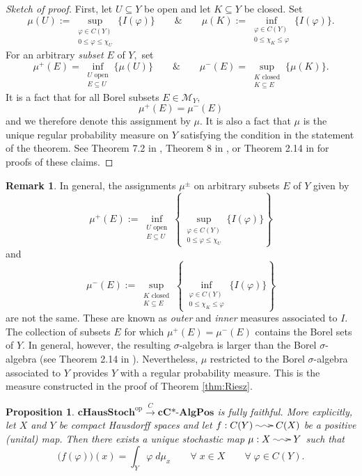 \documentclass[12pt]{article}
\makeatletter
\edef\t{\pgfmathresult}%
\theoremstyle{theorem}
\newtheorem{proposition}[equation]{Proposition}
\theoremstyle{definition}
\newtheorem{remark}[equation]{Remark}
\numberwithin{equation}{section}
\let\s=\sigma \let\t=\tau \let\u=\upsilon \let\f=\phi \let\c=\chi
\def\vf{\varphi}
\newcommand{\be}{\begin{equation}}
\newcommand{\ee}{\end{equation}}
\newcommand{\bn}{\begin{proposition}}
\newcommand{\en}{\end{proposition}}
\newcommand{\bprf}{\begin{proof}}
\newcommand{\eprf}{\end{proof}}
\newcommand{\br}{\begin{remark}}
\newcommand{\er}{\end{remark}}
\newcommand{\<}{\langle}
\renewcommand{\>}{\rangle}
\newcommand{\aand}{\qquad \& \qquad}
\def\K{{{\mathbb K}}}
\newcommand{\cCAlgPos}{\mathbf{cC\text{*-}AlgPos}}
\newcommand{\op}{\mathrm{op}}
\newcommand{\cHStoch}{\mathbf{cHausStoch}}
\newcommand{\stoch}{\;\xy0;/r.25pc/:\ar@{~>}(3,0);(-3,0);\endxy\;}
\makeatother
\begin{document}
\bprf
[Sketch of proof]
First, let $U\subseteq Y$ be open and let $K\subseteq Y$ be closed. 
Set 
\be
\mu(U):=\sup_{\substack{\vf\in C(Y)\\0\le\vf\le\chi_{U}}}\big\{I(\vf)\big\}
\aand
\mu(K):=\inf_{\substack{\vf\in C(Y)\\0\le\chi_{K}\le\vf}}\big\{I(\vf)\big\}.
\ee
For an arbitrary \emph{subset} $E$ of $Y,$ set 
\be
\mu^{+}(E)=\inf_{\substack{\text{$U$ open}\\E\subseteq U}}\big\{\mu(U)\big\}
\aand
\mu^{-}(E)=\sup_{\substack{\text{$K$ closed}\\K\subseteq E}}\big\{\mu(K)\big\}.
\ee
It is a fact that for all Borel subsets $E\in\mathcal{M}_{Y},$
\be
\mu^{+}(E)=\mu^{-}(E)
\ee
and we therefore denote this assignment by $\mu.$ It is also a fact that
$\mu$ is the unique regular probability measure on $Y$ satisfying the
condition in the statement of the theorem. 
See Theorem 7.2 in \cite{Fo07}, Theorem 8 in 
\cite{Ta09_245B12}, or Theorem 2.14 in \cite{Ru87} for proofs of these claims. 
\eprf

\br
In general, the assignments $\mu^{\pm}$ on arbitrary subsets $E$ of $Y$
given by 
\be
\mu^{+}(E):=\inf_{\substack{\text{$U$ open}\\E\subseteq U}}
\left\{\sup_{\substack{\vf\in C(Y)\\0\le\vf\le\chi_{U}}}\big\{I(\vf)\big\}
\right\}
\ee
and
\be
\mu^{-}(E):=\sup_{\substack{\text{$K$ closed}\\K\subseteq E}}
\left\{\inf_{\substack{\vf\in C(Y)\\0\le\chi_{K}\le\vf}}\big\{I(\vf)\big\}
\right\}
\ee
are not the same. These are known as \emph{outer} and \emph{inner}
measures associated to $I.$ The collection of subsets $E$ for which 
$\mu^{+}(E)=\mu^{-}(E)$ contains the Borel sets of $Y.$
In general, however, the resulting $\s$-algebra is larger than the
Borel $\s$-algebra (see Theorem 2.14 in \cite{Ru87}). Nevertheless, 
$\mu$ restricted to the Borel $\s$-algebra associated to $Y$
provides $Y$ with a regular probability measure. 
This is the measure constructed in the proof of Theorem \ref{thm:Riesz}. 
\er

\bn
$\cHStoch^{\op}\xrightarrow{C}\cCAlgPos$ is fully faithful.
More explicitly, 
let $X$ and $Y$ be compact Hausdorff spaces and let 
$f:C(Y)\stoch C(X)$ be a positive (unital) map.
Then there exists a unique stochastic map 
$\mu:X\stoch Y$ such that 
\be
\label{eq:positivemapstochasticprocess}
\big(f(\vf)\big)(x)=\int_{Y}\vf\;d\mu_{x}
\qquad\forall\;x\in X\qquad\forall\;\vf\in C(Y). 
\ee
\en
\end{document}
